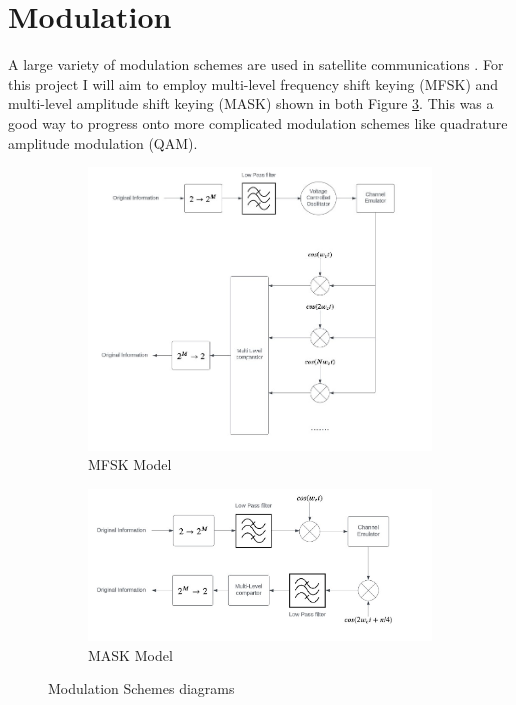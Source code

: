 \documentclass[conference]{IEEEtran}
\begin{document}
\section{Modulation}
A large variety of modulation schemes are used in satellite communications \cite{smith_modulation_2017}. For this project I will aim to employ multi-level frequency shift keying (MFSK) and multi-level amplitude shift keying (MASK) shown in both Figure \ref{fig:Moduluation_models}. This was a good way to progress onto more complicated modulation schemes like quadrature amplitude modulation (QAM).
\begin{figure}[h]
\centering
\begin{subfigure}{0.5\textwidth}
	\centering
	\includegraphics[width=\textwidth]{MFSK_model.png}
	\caption{MFSK Model}
	\label{fig:MFSK_model}
\end{subfigure}
\centering
\begin{subfigure}{0.5\textwidth}
	\centering
	\includegraphics[width=\textwidth]{MASK_model.png}
	\caption{MASK Model}
	\label{fig:MASK_model}
\end{subfigure}
\caption{Modulation Schemes diagrams}
\label{fig:Moduluation_models}
\end{figure}
\label{sec:1}
\end{document}
